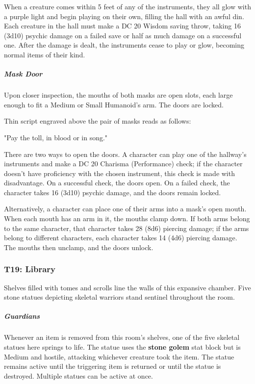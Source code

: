 \documentclass[10pt,a4paper,twoside,bg=print,twocolumn,openany,nodeprecatedcode]{dndbook}
\begin{document}
When a creature comes within 5 feet of any of the instruments, they all glow with a purple light and begin playing on their own, filling the hall with an awful din. Each creature in the hall must make a DC 20 Wisdom saving throw, taking 16 (3d10) psychic damage on a failed save or half as much damage on a successful one. After the damage is dealt, the instruments cease to play or glow, becoming normal items of their kind.

\subparagraph{Mask Door}
Upon closer inspection, the mouths of both masks are open slots, each large enough to fit a Medium or Small Humanoid's arm. The doors are locked.

Thin script engraved above the pair of masks reads as follows:

\begin{DndReadAloud}{}
"Pay the toll, in blood or in song."

\end{DndReadAloud}

There are two ways to open the doors. A character can play one of the hallway's instruments and make a DC 20 Charisma (Performance) check; if the character doesn't have proficiency with the chosen instrument, this check is made with disadvantage. On a successful check, the doors open. On a failed check, the character takes 16 (3d10) psychic damage, and the doors remain locked.

Alternatively, a character can place one of their arms into a mask's open mouth. When each mouth has an arm in it, the mouths clamp down. If both arms belong to the same character, that character takes 28 (8d6) piercing damage; if the arms belong to different characters, each character takes 14 (4d6) piercing damage. The mouths then unclamp, and the doors unlock.

\subsubsection{T19: Library}
\begin{DndReadAloud}{}
Shelves filled with tomes and scrolls line the walls of this expansive chamber. Five stone statues depicting skeletal warriors stand sentinel throughout the room.

\end{DndReadAloud}

\subparagraph{Guardians}
Whenever an item is removed from this room's shelves, one of the five skeletal statues here springs to life. The statue uses the \textbf{stone golem} stat block but is Medium and hostile, attacking whichever creature took the item. The statue remains active until the triggering item is returned or until the statue is destroyed. Multiple statues can be active at once.
\end{document}
